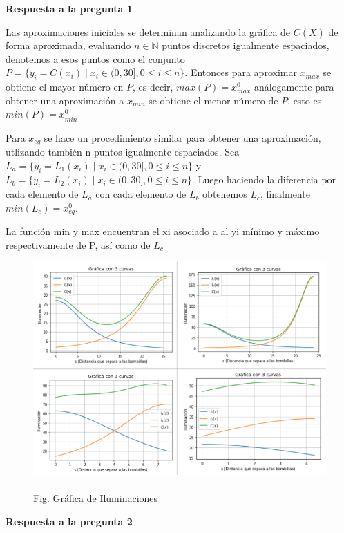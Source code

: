 \documentclass[11pt]{article}
\newcommand{\N}{\mathbb N}
\begin{document}
\newpage
\vspace{0.5cm}
\textbf{Respuesta a la pregunta 1}

Las aproximaciones iniciales se determinan analizando la gráfica de $C(X)$ de forma aproximada, evaluando $n\in\N$ puntos discretos igualmente espaciados, denotemos a esos puntos como el conjunto $P=\{y_i=C(x_i) \mid x_i\in(0,30] , 0 \leq i \leq n \}$. Entonces  para aproximar $x_{max}$ se obtiene el mayor número en $P$, es decir, $max(P)=x^0_{max}$ análogamente para obtener una aproximación a $x_{min}$ se obtiene el menor número de $P$, esto es $min(P)=x^0_{min}$

Para $x_{eq}$  se hace un procedimiento similar para obtener una aproximación, utlizando también n puntos igualmente espaciados. Sea $L_a =  \{y_i=L_{1}(x_i) \mid x_i\in(0,30] , 0 \leq i \leq n \}$ y $L_b = \{y_i=L_{2}(x_i) \mid x_i\in(0,30] , 0 \leq i \leq n \}$. Luego haciendo la diferencia por cada elemento de $L_a$ con cada elemento de $L_b$ obtenemos $L_c$, finalmente $min(L_c) = x^0_{eq}$.

La función min y max encuentran el xi asociado a al yi mínimo y máximo respectivamente de P, así como de $L_c$

\begin{figure}[!h]
	
	\includegraphics[keepaspectratio, width=15cm]{Imagenes/grafica.png}
	\caption{\\Fig. Gráfica de Iluminaciones \label{fig:grafica2}}
\end{figure}

\noindent \textbf{Respuesta a la pregunta 2}
\end{document}
